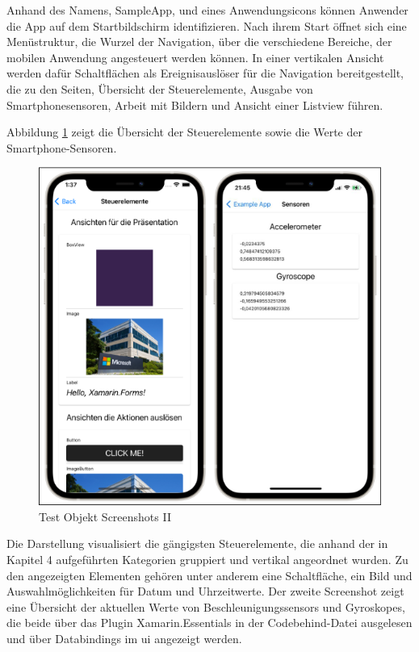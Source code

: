 Anhand des Namens,  SampleApp,  und eines Anwendungsicons können Anwender die App auf dem Startbildschirm identifizieren.  Nach ihrem Start öffnet sich eine Menüstruktur,  die Wurzel der Navigation, über die verschiedene Bereiche, der mobilen Anwendung angesteuert werden können.  In einer vertikalen Ansicht werden dafür Schaltflächen als Ereignisauslöser für die Navigation bereitgestellt,  die zu den Seiten, Übersicht der Steuerelemente,  Ausgabe von Smartphonesensoren,  Arbeit mit Bildern und Ansicht einer Listview führen.  

Abbildung \ref{fig:TestObjectII} zeigt die Übersicht der Steuerelemente sowie die Werte der Smartphone-Sensoren.

\begin{figure}[!ht]
 \includegraphics[width=\textwidth,keepaspectratio]{Images/Screenshot/Sensors.png}
 \caption{Test Objekt Screenshots II}
 \label{fig:TestObjectII}
\end{figure}
Die Darstellung visualisiert die gängigsten Steuerelemente,  die anhand der in Kapitel 4 aufgeführten Kategorien gruppiert und vertikal angeordnet wurden.  Zu den angezeigten Elementen gehören unter anderem eine Schaltfläche,  ein Bild und Auswahlmöglichkeiten für Datum und Uhrzeitwerte.  Der zweite Screenshot zeigt eine Übersicht der aktuellen Werte von Beschleunigungssensors und  Gyroskopes,  die beide über das Plugin Xamarin.Essentials in der Codebehind-Datei ausgelesen und über Databindings im \ac{ui} angezeigt werden.    

